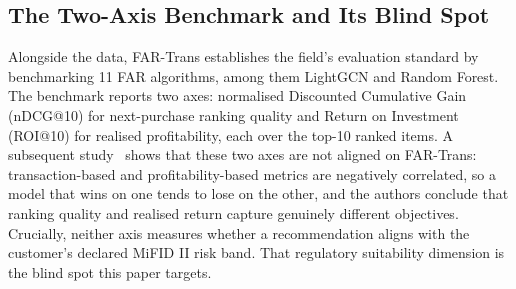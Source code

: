 \subsection{The Two-Axis Benchmark and Its Blind Spot}
Alongside the data, FAR-Trans establishes the field's evaluation standard by benchmarking 11 FAR algorithms, among them LightGCN and Random Forest. The benchmark reports two axes: normalised Discounted Cumulative Gain (nDCG@10) for next-purchase ranking quality and Return on Investment (ROI@10) for realised profitability, each over the top-10 ranked items. A subsequent study~\cite{10.1145/3780097} shows that these two axes are not aligned on FAR-Trans: transaction-based and profitability-based metrics are negatively correlated, so a model that wins on one tends to lose on the other, and the authors conclude that ranking quality and realised return capture genuinely different objectives. Crucially, neither axis measures whether a recommendation aligns with the customer's declared MiFID II risk band. That regulatory suitability dimension is the blind spot this paper targets.
